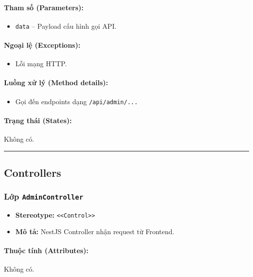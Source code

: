 \documentclass[12pt,a4paper]{article}
\begin{document}
\paragraph{Tham số (Parameters):}
\begin{itemize}[leftmargin=*]
    \item \texttt{data} – Payload cấu hình gọi API.
\end{itemize}


\paragraph{Ngoại lệ (Exceptions):}
\begin{itemize}[leftmargin=*]
    \item Lỗi mạng HTTP.
\end{itemize}


\paragraph{Luồng xử lý (Method details):}
\begin{itemize}[leftmargin=*]
    \item Gọi đến endpoints dạng \texttt{/api/admin/...}
\end{itemize}


\paragraph{Trạng thái (States):}
Không có.

\vskip 0.5cm
\noindent\rule{\textwidth}{0.5pt}
\vskip 0.5cm

\subsection{Controllers}

\subsubsection{Lớp \texttt{AdminController}}
\begin{itemize}[leftmargin=*]
    \item \textbf{Stereotype:} \texttt{\textless{}\textless{}Control\textgreater{}\textgreater{}}
    \item \textbf{Mô tả:} NestJS Controller nhận request từ Frontend.
\end{itemize}

\paragraph{Thuộc tính (Attributes):}
Không có.
\end{document}
